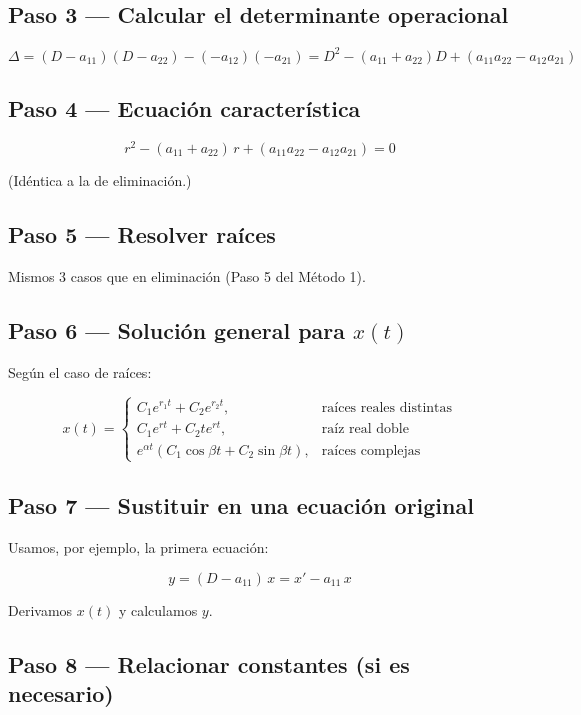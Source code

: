 \documentclass[9pt,a4paper]{article}
\begin{document}
\subsection{Paso 3 --- Calcular el determinante operacional}

\[
\Delta = (D - a_{11})(D - a_{22}) - (-a_{12})(-a_{21})
       = D^{2} - (a_{11}+a_{22})D + (a_{11}a_{22} - a_{12}a_{21})
\]

\subsection{Paso 4 --- Ecuación característica}

\[
r^{2} - (a_{11}+a_{22})\,r + (a_{11}a_{22} - a_{12}a_{21}) = 0
\]

(Idéntica a la de eliminación.)

\subsection{Paso 5 --- Resolver raíces}

Mismos 3 casos que en eliminación (Paso 5 del Método 1).

\subsection{Paso 6 --- Solución general para \(x(t)\)}

Según el caso de raíces:

\[
x(t) =
\begin{cases}
C_1 e^{r_1 t} + C_2 e^{r_2 t}, & \text{raíces reales distintas} \\[2pt]
C_1 e^{r t} + C_2 t e^{r t},   & \text{raíz real doble} \\[2pt]
e^{\alpha t}(C_1\cos\beta t + C_2\sin\beta t), & \text{raíces complejas}
\end{cases}
\]

\subsection{Paso 7 --- Sustituir en una ecuación original}

Usamos, por ejemplo, la primera ecuación:

\[
y = (D - a_{11})\,x = x' - a_{11}\,x
\]

Derivamos \(x(t)\) y calculamos \(y\).

\subsection{Paso 8 --- Relacionar constantes (si es necesario)}
\end{document}
